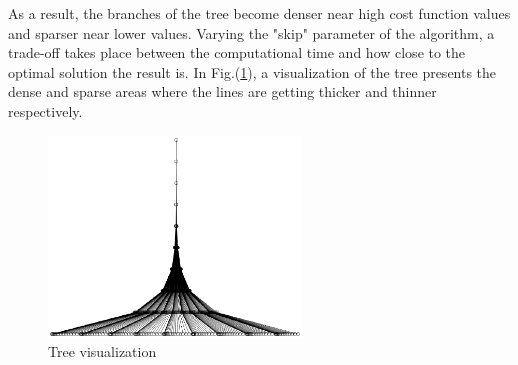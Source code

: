 \documentclass[journal]{new-aiaa}
\begin{document}
As a result, the branches of the tree become denser near high cost function values and sparser near lower values. Varying the "skip" parameter of the algorithm, a trade-off takes place between the computational time and how close to the optimal solution the result is. In Fig.(\ref{fig:tree.eps}), a visualization of the tree presents the dense and sparse areas where the lines are getting thicker and thinner respectively.
\begin{figure}[H]
\centering
\includegraphics[width=0.6\textwidth]{tree.eps}
\caption{Tree visualization}
\label{fig:tree.eps}
\end{figure}
\end{document}
